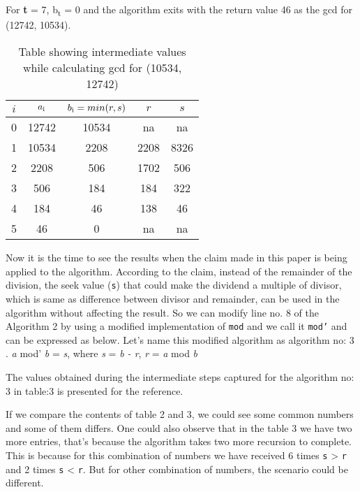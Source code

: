 \documentclass[12pt]{article}
\begin{document}
\begin{multicols}{2}
For \textbf{t} = 7, b\textsubscript{t} = 0 and the algorithm exits with the return value 
46 as the gcd for (12742, 10534).
\begin{table*}[t]
\centering
	\begin{tabular}{c | c | c | c| c}
	\hline
	$i$ & $a\textsubscript{i}$ & $b\textsubscript{i} = min(r,s)$ & $r$ & $s$\\ [0.5ex] 
	\hline
		0 & 12742 & 10534 & na   & na \\ 
		1 & 10534 & 2208  & 2208 & 8326\\  
		2 & 2208  & 506   & 1702 & 506\\
		3 & 506   & 184   & 184  & 322\\
		4 & 184   & 46    & 138  & 46\\
		5 & 46    & 0     & na   & na
	\end{tabular}
\caption{Table showing intermediate values while calculating gcd for (10534, 12742)}
\label{table:4}
\end{table*}

Now it is the time to see the results when the claim made in this paper is being applied 
to the algorithm. According to the claim, instead of the remainder of the division, the seek value (\texttt{s}) that could make the dividend a multiple of divisor, which is same as difference between divisor and remainder, can be used in the algorithm without affecting the result. So we can modify line no. 8 of the Algorithm 2 by using a modified implementation of \texttt{mod} and we call it \texttt{mod'} and can be expressed as below. Let's name this modified algorithm as algorithm no: 3 .  \linebreak
\textit{a} mod' \textit{b} = \textit{s}, where  \textit{s} = \textit{b - r}, \textit{r} = \textit{a} mod \textit{b}

The values obtained during the intermediate steps captured for the algorithm no: 3 in table:3 is presented for the reference.

If we compare the contents of table 2 and 3, we could see some common numbers and some of them differs. One could also observe that in the table 3 we have two more entries, that's because the algorithm takes two more recursion to complete. This is because for 
this combination of numbers we have received 6 times \texttt{s} > \texttt{r} and 2 times 
\texttt{s} < \texttt{r}. But for other combination of numbers, the scenario could be different.


\end{multicols}
\end{document}
